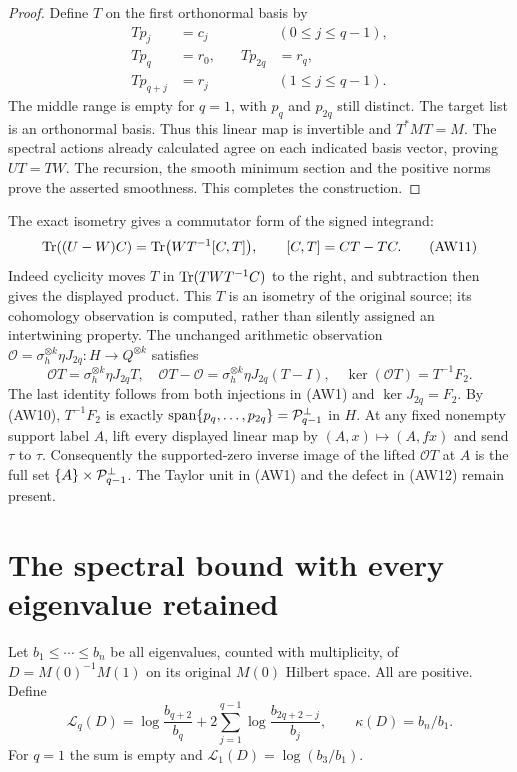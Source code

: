 \begin{proof}
Define $T$ on the first orthonormal basis by
\[
 \begin{aligned}
 Tp_j&=c_j&& (0\le j\le q-1),\\
 Tp_q&=r_0,&\quad Tp_{2q}&=r_q,\\
 Tp_{q+j}&=r_j&& (1\le j\le q-1).
 \end{aligned}
 \tag{AW10}
\]
The middle range is empty for $q=1$, with $p_q$ and $p_{2q}$
still distinct. The target list is an orthonormal basis. Thus this
linear map is invertible and $T^*MT=M$. The spectral actions
already calculated agree on each indicated basis vector, proving
$UT=TW$. The recursion, the smooth minimum section and the positive
norms prove the asserted smoothness. This completes the construction.
\end{proof}

The exact isometry gives a commutator form of the signed integrand:
\[
 \operatorname{Tr}((U-W)C)=\operatorname{Tr}\bigl(WT^{-1}[C,T]\bigr),
 \qquad [C,T]=CT-TC.
 \tag{AW11}
\]
Indeed cyclicity moves $T$ in $\operatorname{Tr}(TWT^{-1}C)$ to the right,
and subtraction then gives the displayed product.
This $T$ is an isometry of the original source; its cohomology
observation is computed, rather than silently assigned an
intertwining property. The unchanged arithmetic observation
$\mathcal O=\sigma_h^{\otimes k}\eta J_{2q}:H\to Q^{\otimes k}$
satisfies
\[
 \mathcal O T=\sigma_h^{\otimes k}\eta J_{2q}T,
 \quad \mathcal O T-\mathcal O
       =\sigma_h^{\otimes k}\eta J_{2q}(T-I),
 \quad \ker(\mathcal O T)=T^{-1}F_2.
 \tag{AW12}
\]
The last identity follows from both injections in (AW1) and
$\ker J_{2q}=F_2$. By (AW10), $T^{-1}F_2$ is exactly
$\operatorname{span}\{p_q,\ldots,p_{2q}\}
=\mathcal P_{q-1}^{\perp}$ in $H$.
At any fixed nonempty support label $A$, lift every displayed
linear map by $(A,x)\mapsto(A,fx)$ and send $\tau$ to $\tau$.
Consequently the supported-zero inverse image of the lifted
$\mathcal O T$ at $A$ is the full set
$\{A\}\times\mathcal P_{q-1}^{\perp}$. The Taylor unit in (AW1)
and the defect in (AW12) remain present.

\section{The spectral bound with every eigenvalue retained}

Let $b_1\le\cdots\le b_n$ be all eigenvalues, counted with
multiplicity, of $D=M(0)^{-1}M(1)$ on its original $M(0)$
Hilbert space. All are positive. Define
\[
 \mathcal L_q(D)=\log\frac{b_{q+2}}{b_q}
       +2\sum_{j=1}^{q-1}\log\frac{b_{2q+2-j}}{b_j},
 \qquad \kappa(D)=b_n/b_1.
 \tag{AW13}
\]
For $q=1$ the sum is empty and $\mathcal L_1(D)=\log(b_3/b_1)$.

